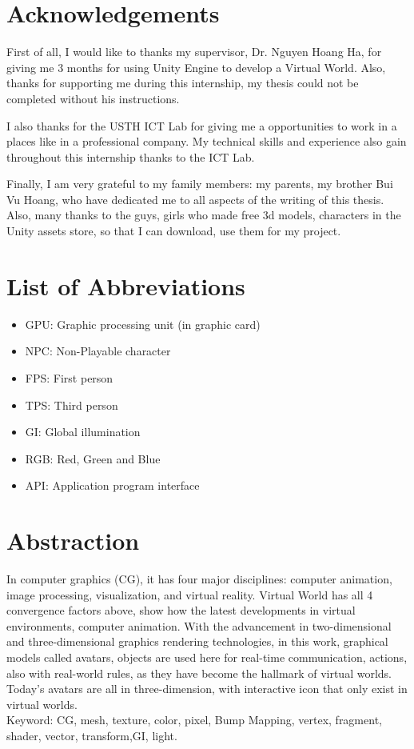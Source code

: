 \documentclass[a4paper, 13pt]{extarticle}
\begin{document}
\newpage
\setcounter{secnumdepth}{4}
\setcounter{tocdepth}{4}
\tableofcontents
\setcounter{page}{2}
\newpage

\newpage
\section*{\color{cyan}\Large Acknowledgements}

First of all, I would like to thanks my supervisor, Dr. Nguyen Hoang Ha, for giving me 3 months for using  Unity Engine to develop a Virtual World. Also, thanks for supporting me during this internship, my thesis could not be completed without his instructions. 

I also thanks for the USTH ICT Lab for giving me a opportunities to work in a places like in a professional company. My technical skills and experience also gain throughout this internship thanks to the ICT Lab.

Finally, I am very grateful to my family members: my parents, my brother Bui Vu Hoang, who have dedicated me to all aspects of the writing of this thesis. Also, many thanks to the guys, girls who made free 3d models, characters in the Unity assets store, so that I can download, use them for my project. 
\newpage
 
 \newpage
 \appendix
  \renewcommand{\thesubsection}{\Alph{section}}
 \renewcommand{\thesubsection}{\arabic{subsection}}
\section*{\Large List of Abbreviations} 
\begin{itemize}
	\item GPU: Graphic processing unit (in graphic card)
	\item NPC: Non-Playable character
	\item FPS: First person
	\item TPS: Third person
	\item GI: Global illumination	
	\item RGB: Red, Green and Blue
	\item API: Application program interface 
\end{itemize}
\newpage
\section{\Large Abstraction}
 In computer graphics (CG), it has four major disciplines: computer animation, image processing, visualization, and virtual reality. Virtual World has all 4 convergence factors above, show how the latest developments in virtual environments, computer animation. With the advancement in two-dimensional and three-dimensional graphics rendering technologies, in this work, graphical models called avatars, objects are used here for real-time communication, actions, also with real-world rules, as they have become the hallmark of virtual worlds. Today's avatars	are all in three-dimension, with interactive icon that only exist in virtual worlds. \\
 Keyword: CG, mesh, texture, color, pixel, Bump Mapping, vertex, fragment, shader, vector, transform,GI, light.
 
\end{document}
